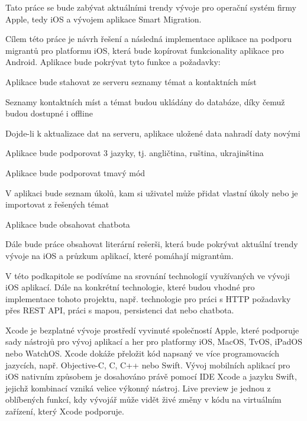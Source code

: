 \par

Tato práce se bude zabývat aktuálními trendy vývoje pro operační systém firmy Apple, tedy iOS a vývojem aplikace Smart Migration.


\pagebreak
{}

Cílem této práce je návrh řešení a následná implementace aplikace na podporu migrantů pro platformu iOS, která bude kopírovat funkcionality aplikace pro Android. Aplikace bude pokrývat tyto funkce a požadavky:
\startitemize
\item Aplikace bude stahovat ze serveru seznamy témat a kontaktních míst
\item Seznamy kontaktních míst a témat budou ukládány do databáze, díky čemuž budou dostupné i offline
\item Dojde-li k aktualizace dat na serveru, aplikace uložené data nahradí daty novými
\item Aplikace bude podporovat 3 jazyky, tj. angličtina, ruština, ukrajinština
\item Aplikace bude podporovat tmavý mód
\item V aplikaci bude seznam úkolů, kam si uživatel může přidat vlastní úkoly nebo je importovat z řešených témat
\item Aplikace bude obsahovat chatbota
\stopitemize

Dále bude práce obsahovat literární rešerši, která bude pokrývat aktuální trendy vývoje na iOS a průzkum aplikací, které pomáhají migrantům.











V této podkapitole se podíváme na srovnání technologií využívaných ve vývoji iOS aplikací. Dále na konkrétní technologie, které budou vhodné pro implementace tohoto projektu, např. technologie pro práci s HTTP požadavky přes REST API, práci s mapou, persistenci dat nebo chatbota.



Xcode je bezplatné vývoje prostředí vyvinuté společností Apple, které podporuje sady nástrojů pro vývoj aplikací a her pro platformy iOS, MacOS, TvOS, iPadOS nebo WatchOS. Xcode dokáže přeložit kód napsaný ve více programovacích jazycích, např. Objective-C, C, C++ nebo Swift. Vývoj mobilních aplikací pro iOS nativním způsobem je dosahováno právě pomocí IDE Xcode a jazyku Swift, jejichž kombinací vzniká velice výkonný nástroj. Live preview je jednou z oblíbených funkcí, kdy vývojář může vidět živé změny v kódu na virtuálním zařízení, který Xcode podporuje.

